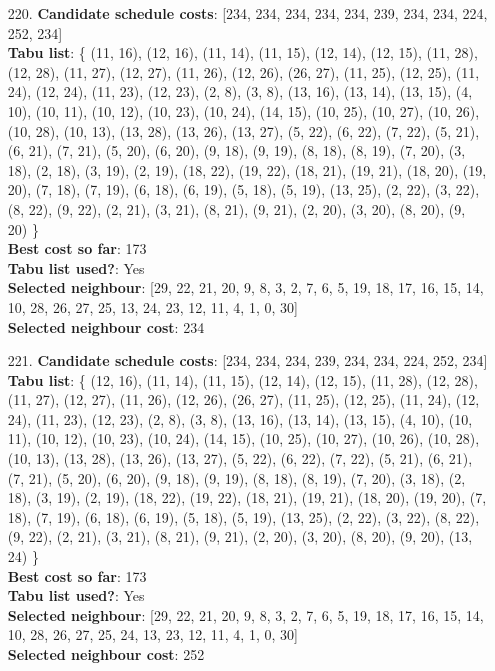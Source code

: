 \documentclass[fleqn]{article}
\begin{document}
\begin{itemize}
    \item[220.] \textbf{Candidate schedule costs}: [234, 234, 234, 234, 234, 239, 234, 234, 224, 252, 234] \\
    \textbf{Tabu list}: \{ (11, 16), (12, 16), (11, 14), (11, 15), (12, 14), (12, 15), (11, 28), (12, 28), (11, 27), (12, 27), (11, 26), (12, 26), (26, 27), (11, 25), (12, 25), (11, 24), (12, 24), (11, 23), (12, 23), (2, 8), (3, 8), (13, 16), (13, 14), (13, 15), (4, 10), (10, 11), (10, 12), (10, 23), (10, 24), (14, 15), (10, 25), (10, 27), (10, 26), (10, 28), (10, 13), (13, 28), (13, 26), (13, 27), (5, 22), (6, 22), (7, 22), (5, 21), (6, 21), (7, 21), (5, 20), (6, 20), (9, 18), (9, 19), (8, 18), (8, 19), (7, 20), (3, 18), (2, 18), (3, 19), (2, 19), (18, 22), (19, 22), (18, 21), (19, 21), (18, 20), (19, 20), (7, 18), (7, 19), (6, 18), (6, 19), (5, 18), (5, 19), (13, 25), (2, 22), (3, 22), (8, 22), (9, 22), (2, 21), (3, 21), (8, 21), (9, 21), (2, 20), (3, 20), (8, 20), (9, 20) \} \\
    \textbf{Best cost so far}: 173 \\
    \textbf{Tabu list used?}: Yes \\
    \textbf{Selected neighbour}: [29, 22, 21, 20, 9, 8, 3, 2, 7, 6, 5, 19, 18, 17, 16, 15, 14, 10, 28, 26, 27, 25, 13, 24, 23, 12, 11, 4, 1, 0, 30] \\
    \textbf{Selected neighbour cost}: 234
      

    \item[221.] \textbf{Candidate schedule costs}: [234, 234, 234, 239, 234, 234, 224, 252, 234] \\
    \textbf{Tabu list}: \{ (12, 16), (11, 14), (11, 15), (12, 14), (12, 15), (11, 28), (12, 28), (11, 27), (12, 27), (11, 26), (12, 26), (26, 27), (11, 25), (12, 25), (11, 24), (12, 24), (11, 23), (12, 23), (2, 8), (3, 8), (13, 16), (13, 14), (13, 15), (4, 10), (10, 11), (10, 12), (10, 23), (10, 24), (14, 15), (10, 25), (10, 27), (10, 26), (10, 28), (10, 13), (13, 28), (13, 26), (13, 27), (5, 22), (6, 22), (7, 22), (5, 21), (6, 21), (7, 21), (5, 20), (6, 20), (9, 18), (9, 19), (8, 18), (8, 19), (7, 20), (3, 18), (2, 18), (3, 19), (2, 19), (18, 22), (19, 22), (18, 21), (19, 21), (18, 20), (19, 20), (7, 18), (7, 19), (6, 18), (6, 19), (5, 18), (5, 19), (13, 25), (2, 22), (3, 22), (8, 22), (9, 22), (2, 21), (3, 21), (8, 21), (9, 21), (2, 20), (3, 20), (8, 20), (9, 20), (13, 24) \} \\
    \textbf{Best cost so far}: 173 \\
    \textbf{Tabu list used?}: Yes \\
    \textbf{Selected neighbour}: [29, 22, 21, 20, 9, 8, 3, 2, 7, 6, 5, 19, 18, 17, 16, 15, 14, 10, 28, 26, 27, 25, 24, 13, 23, 12, 11, 4, 1, 0, 30] \\
    \textbf{Selected neighbour cost}: 252
      


\end{itemize}
\end{document}
